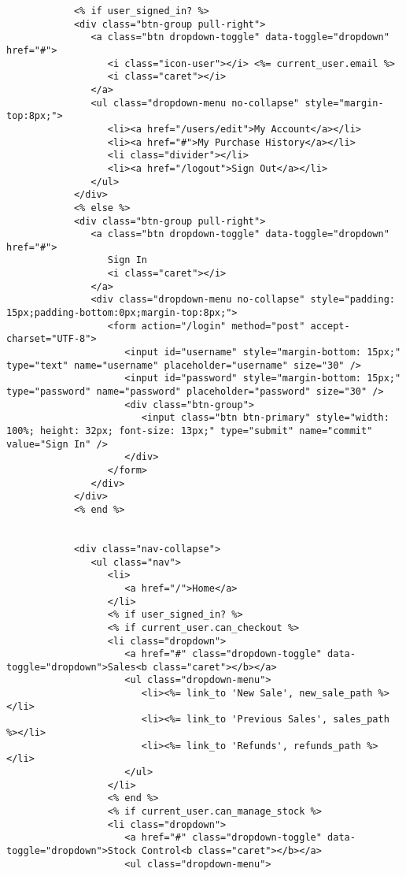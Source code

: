 \documentclass[a4paper]{article}
\begin{document}
\begin{verbatim}
            <% if user_signed_in? %>
            <div class="btn-group pull-right">
               <a class="btn dropdown-toggle" data-toggle="dropdown" href="#">
                  <i class="icon-user"></i> <%= current_user.email %>
                  <i class="caret"></i>
               </a>
               <ul class="dropdown-menu no-collapse" style="margin-top:8px;">
                  <li><a href="/users/edit">My Account</a></li>
                  <li><a href="#">My Purchase History</a></li>
                  <li class="divider"></li>
                  <li><a href="/logout">Sign Out</a></li>
               </ul>
            </div>
            <% else %>
            <div class="btn-group pull-right">
               <a class="btn dropdown-toggle" data-toggle="dropdown" href="#">
                  Sign In
                  <i class="caret"></i>
               </a>
               <div class="dropdown-menu no-collapse" style="padding: 15px;padding-bottom:0px;margin-top:8px;">
                  <form action="/login" method="post" accept-charset="UTF-8">
                     <input id="username" style="margin-bottom: 15px;" type="text" name="username" placeholder="username" size="30" />
                     <input id="password" style="margin-bottom: 15px;" type="password" name="password" placeholder="password" size="30" />
                     <div class="btn-group">
                        <input class="btn btn-primary" style="width: 100%; height: 32px; font-size: 13px;" type="submit" name="commit" value="Sign In" />
                     </div>
                  </form>
               </div>
            </div>
            <% end %>


            <div class="nav-collapse">
               <ul class="nav">
                  <li>
                     <a href="/">Home</a>
                  </li>
                  <% if user_signed_in? %>
                  <% if current_user.can_checkout %>
                  <li class="dropdown">
                     <a href="#" class="dropdown-toggle" data-toggle="dropdown">Sales<b class="caret"></b></a>
                     <ul class="dropdown-menu">
                        <li><%= link_to 'New Sale', new_sale_path %></li>
                        <li><%= link_to 'Previous Sales', sales_path %></li>
                        <li><%= link_to 'Refunds', refunds_path %></li>
                     </ul>
                  </li>
                  <% end %>
                  <% if current_user.can_manage_stock %>
                  <li class="dropdown">
                     <a href="#" class="dropdown-toggle" data-toggle="dropdown">Stock Control<b class="caret"></b></a>
                     <ul class="dropdown-menu">


\end{verbatim}
\end{document}
